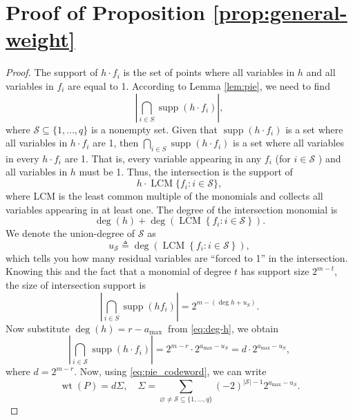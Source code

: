 \documentclass[conference]{IEEEtran}
\theoremstyle{definition}
\newcommand{\wt}{\operatorname{wt}}
\renewcommand{\S}{\mathcal{S}}
\begin{document}
\section{Proof of Proposition \ref{prop:general-weight}}
\begin{proof}
The support of $h\cdot f_i$ is the set of points where all variables in $h$ and all variables in $f_i$ are equal to 1. According to Lemma \ref{lem:pie}, we need to find
\[
\left|\bigcap_{i \in S} \operatorname{supp}\left(h\cdot f_i\right)\right|,
\]
where $\mathcal{S} \subseteq\{1, \ldots, q\}$ is a nonempty set. Given that $\operatorname{supp}\left(h\cdot f_i\right)$ is a set where all variables in $h\cdot f_i$ are 1, then $\bigcap_{i \in S} \operatorname{supp}\left(h\cdot f_i\right)$ is a set where all variables in every $h\cdot f_i$ are 1. That is, every variable appearing in any $f_i$ (for $i \in \mathcal{S}$ ) and all variables in $h$ must be 1. Thus, the intersection is the support of
\[
h \cdot \operatorname{LCM}\{f_i: i \in \S\},
\]
where LCM is the least common multiple of the monomials and collects all variables appearing in at least one. The degree of the intersection monomial is 
\[
\operatorname{deg}(h)+\operatorname{deg}\left(\operatorname{LCM}\left\{f_i: i \in \S\right\}\right).
\]
We denote the union-degree of $\S$ as
\[
u_{\S}\triangleq\operatorname{deg}\left(\operatorname{LCM}\left\{f_i: i \in \S\right\}\right),
\]
which tells you how many residual variables are ``forced to 1'' in the intersection. Knowing this and the fact that a monomial of degree $t$ has support size $2^{m-t}$, the size of intersection support is 
\[
\left|\bigcap_{i \in S} \operatorname{supp}\left(h f_i\right)\right|=2^{m-\left(\operatorname{deg} h+u_S\right)}.
\]
Now substitute $\operatorname{deg}(h)=r-a_{\text {max }}$ from \eqref{eq:deg-h}, we obtain 
\[
\left|\bigcap_{i \in \mathcal{S}} \operatorname{supp}\left(h \cdot f_i\right)\right|=2^{m-r} \cdot 2^{a_{\max }-u_S}=d \cdot 2^{a_{\max }-u_S},
\]
where $d = 2^{m-r}$. Now, using \eqref{eq:pie_codeword}, we can write 
\begin{equation*}
    \wt(P)=d \Sigma, \quad \Sigma=\sum_{\varnothing \neq \mathcal{S} \subseteq\{1, \ldots, q\}}(-2)^{|\mathcal{S}|-1} 2^{a_{\max }-u_\mathcal{S}}.
\end{equation*}
\end{proof}

\end{document}
